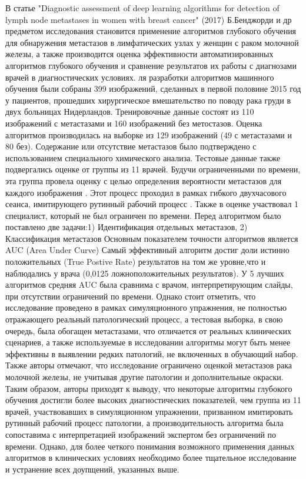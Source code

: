 \documentclass[14pt, a4paper]{extarticle}
\begin{document}
В статье "Diagnostic assessment of deep learning algorithms
for detection of lymph node metastases in women with breast cancer" (2017) Б.Бенджорди и др \cite{bejnordi2017diagnostic} предметом исследования становится применение алгоритмов глубокого обучения для обнаружения метастазов в лимфатических узлах у женщин с раком молочной железы, а также производится оценка эффективности автоматизированных алгоритмов глубокого обучения  и сравнение результатов их работы с диагнозами врачей в диагностических условиях.
ля разработки алгоритмов машинного обучения были собраны 399 изображений, сделанных в первой половине 2015 год у пациентов, прошедших хирургическое вмешательство по поводу рака груди в двух больницах Нидерландов. Тренировочные данные состоят из 110 изображений с метастазами  и 160 изображений без метостазов. Оценка алгоритмов производилась на выборке из 129 изображений (49 с метастазами и 80 без).
Содержание или отсутствие метастазов было подтверждено с использованием специального химического анализа.
Тестовые данные также подвергались оценке от группы из 11 врачей. Будучи ограниченными  по времени, эта группа провела оценку с целью определения вероятности метастазов для каждого изображения . Этот процесс проходил в рамках гибкого двухчасового сеанса, имитирующего рутинный рабочий процесс . Также в оценке участвовал 1 специалист, который не был ограничен по времени. Перед алгоритмом было поставлено две задачи:1) Идентификация отдельных метастазов, 2) Классификация метастазов
Основным показателем точности алгоритмов является AUC (Area Under Curve)
Самый эффективный алгоритм достиг доли истинно положительных (True Postive Rate) результатов на том же уровне,что и наблюдались у врача
(0,0125 ложноположительных результатов). У 5 лучших алгоритмов средняя AUC была сравнима с врачом, интерпретирующим слайды, при отсутствии ограничений по времени.
Однако стоит отметить, что исследование проведено в рамках симуляционного упражнения, не полностью отражающего реальный патологический процесс, а тестовая выборка, в свою очередь, была обогащен метастазами, что отличается от реальных клинических сценариев, а также используемые в исследовании алгоритмы могут быть менее эффективны в выявлении редких патологий, не включенных в обучающий набор.
Также  авторы отмечают, что исследование ограничено оценкой метастазов рака молочной железы, не учитывая другие патологии и дополнительные окраски.
Таким образом, авторы приходят к выводу, что некоторые алгоритмы глубокого обучения достигли более высоких диагностических показателей, чем группа из 11 врачей, участвовавших в симуляционном упражнении, призванном имитировать рутинный рабочий процесс патологии, а производительность алгоритма была сопоставима с интерпретацией изображений экспертом без ограничений по времени. 
Однако, для более четкого понимания возможного применения данных алгоритмов в клинических условиях необходимо более тщательное исследование и устранение всех доупщений, указанных выше.
\end{document}
